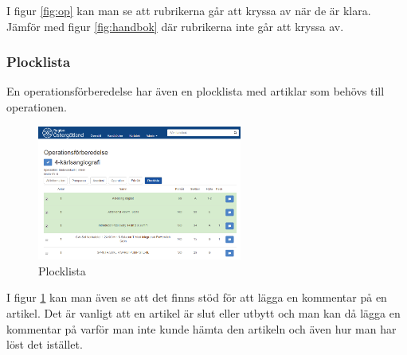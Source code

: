 I figur \ref{fig:op} kan man se att rubrikerna går att kryssa av när de är klara. Jämför med figur \ref{fig:handbok} där rubrikerna inte går att kryssa av.

\subsubsection{Plocklista}
En operationsförberedelse har även en plocklista med artiklar som behövs till operationen.

\begin{figure}
  \centering
  \includegraphics[width=0.6\textwidth]{images/site/plocklista}
  \caption{Plocklista}
  \label{fig:plocklista}
\end{figure}

I figur \ref{fig:plocklista} kan man även se att det finns stöd för att lägga en kommentar på en artikel.
Det är vanligt att en artikel är slut eller utbytt och man kan då lägga en kommentar på varför man inte kunde hämta den artikeln och även hur man har löst det istället.





